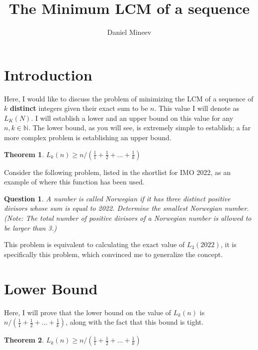 \documentclass{article}
\title{The Minimum LCM of a sequence}
\author{Daniel Mineev}
\newtheorem{theorem}{Theorem}
\newtheorem{question}{Question}
\begin{document}
\maketitle

\section{Introduction}

Here, I would like to discuss the problem of minimizing the LCM of a sequence of \(k\) \textbf{distinct} integers given their exact sum to be \(n\). This value I will denote as \(L_K(N)\). I will establish a lower and an upper bound on this value for any \(n, k \in \mathbb{N}\). The lower bound, as you will see, is extremely simple to establish; a far more complex problem is establishing an upper bound.
\begin{theorem}
	\(L_k(n) \geq n / \left( \frac{1}{1} + \frac{1}{2} + \ldots + \frac{1}{k} \right) \)
\end{theorem}
Consider the following problem, listed in the shortlist for IMO 2022, as an example of where this function has been used.
\begin{question}
	A number is called Norwegian if it has three distinct positive divisors whose sum is equal to 2022. Determine the smallest Norwegian number. \\
	(Note: The total number of positive divisors of a Norwegian number is allowed to be larger than 3.)
\end{question}
This problem is equivalent to calculating the exact value of \(L_3(2022)\), it is specifically this problem, which convinced me to generalize the concept.

\section{Lower Bound}

Here, I will prove that the lower bound on the value of \(L_k(n)\) is \(n /  \left( \frac{1}{1} + \frac{1}{2} + \ldots + \frac{1}{k} \right) \), along with the fact that this bound is tight.

\begin{theorem}
	\(L_k(n) \geq n / \left( \frac{1}{1} + \frac{1}{2} + \ldots + \frac{1}{k} \right) \)
\end{theorem}

\renewcommand\qedsymbol{$\blacksquare$}
\end{document}
